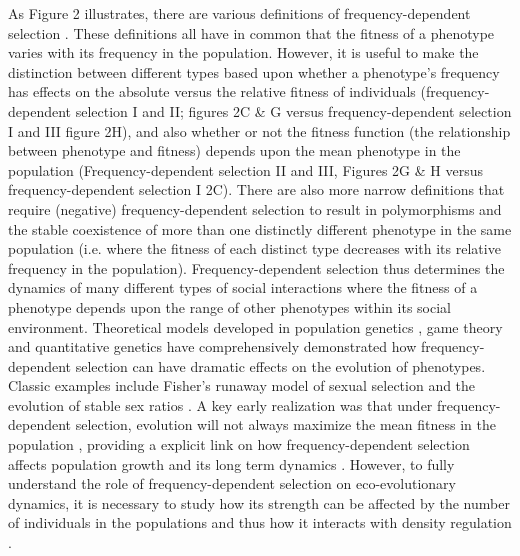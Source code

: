 \documentclass{article}
\begin{document}
 As Figure 2 illustrates, there are various definitions of frequency-dependent selection \citep{Heino1998}. These definitions all have in common that the fitness of a phenotype varies with its frequency in the population. However, it is useful to make the distinction between different types based upon whether a phenotype's frequency has effects on the absolute versus the relative fitness of individuals (frequency-dependent selection I and II; figures 2C \& G versus frequency-dependent selection I and III figure 2H), and also whether or not the fitness function (the relationship between phenotype and fitness) depends upon the mean phenotype in the population (Frequency-dependent selection II and III, Figures 2G \& H versus frequency-dependent selection I 2C). There are also more narrow definitions that require (negative) frequency-dependent selection to result in polymorphisms and the stable coexistence of more than one distinctly different phenotype in the same population (i.e. where the fitness of each distinct type decreases with its relative frequency in the population). Frequency-dependent selection thus determines the dynamics of many different types of social interactions where the fitness of a phenotype depends upon the range of other phenotypes within its social environment. Theoretical models developed in population genetics \citep{Wright1969}, game theory \citep{McNamara&Leimar2020} and quantitative genetics \citep{Lande2007, Engen2020} have comprehensively demonstrated how frequency-dependent selection can have dramatic effects on the evolution of phenotypes. Classic examples include Fisher's runaway model of sexual selection and the evolution of stable sex ratios \citep{Fisher1930}. A key early realization was that under frequency-dependent selection, evolution will not always maximize the mean fitness in the population \citep{Wright1969}, providing a explicit link on how frequency-dependent selection affects population growth and its long term dynamics \citep{Svensson2018}. However, to fully understand the role of frequency-dependent selection on eco-evolutionary dynamics, it is necessary to study how its strength can be affected by the number of individuals in the populations and thus how it interacts with density regulation \citep{Anderson1971, Matessi1976, Asmussen1983, Heino1998, Joshi2001, Engen2020}. 
 
\end{document}
